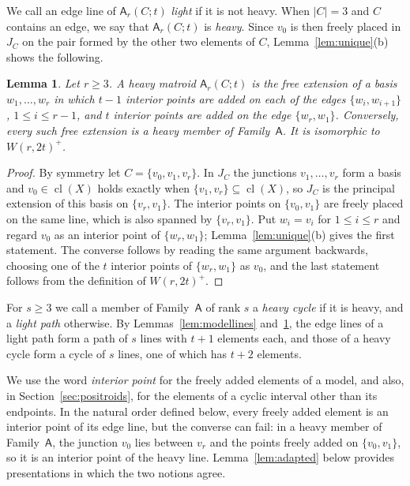 \documentclass[11pt]{amsart}
\newtheorem{lemma}[theorem]{Lemma}
\theoremstyle{definition}
\theoremstyle{remark}
\numberwithin{equation}{section}
\newcommand{\cl}{\operatorname{cl}}
\newcommand{\FA}{\mathsf{A}}
\begin{document}
We call an edge line of $\FA_r(C;t)$ \emph{light} if it is not heavy. When $|C|=3$ and $C$ contains an edge, we say that $\FA_r(C;t)$ is \emph{heavy}. Since $v_0$ is then freely placed in $J_C$ on the pair formed by the other two elements of $C$, Lemma~\ref{lem:unique}(b) shows the following.

\begin{lemma}\label{lem:heavywhirl}
Let $r\ge3$. A heavy matroid $\FA_r(C;t)$ is the free extension of a basis $w_1,\dots,w_r$ in which $t-1$ interior points are added on each of the edges $\{w_i,w_{i+1}\}$, $1\le i\le r-1$, and $t$ interior points are added on the edge $\{w_r,w_1\}$. Conversely, every such free extension is a heavy member of Family~$\FA$. It is isomorphic to $W(r,2t)^+$.
\end{lemma}

\begin{proof}
By symmetry let $C=\{v_0,v_1,v_r\}$. In $J_C$ the junctions $v_1,\dots,v_r$ form a basis and $v_0\in\cl(X)$ holds exactly when $\{v_1,v_r\}\subseteq\cl(X)$, so $J_C$ is the principal extension of this basis on $\{v_r,v_1\}$. The interior points on $\{v_0,v_1\}$ are freely placed on the same line, which is also spanned by $\{v_r,v_1\}$. Put $w_i=v_i$ for $1\le i\le r$ and regard $v_0$ as an interior point of $\{w_r,w_1\}$; Lemma~\ref{lem:unique}(b) gives the first statement. The converse follows by reading the same argument backwards, choosing one of the $t$ interior points of $\{w_r,w_1\}$ as $v_0$, and the last statement follows from the definition of $W(r,2t)^+$.
\end{proof}

For $s\ge3$ we call a member of Family~$\FA$ of rank $s$ a \emph{heavy cycle} if it is heavy, and a \emph{light path} otherwise. By Lemmas~\ref{lem:modellines} and~\ref{lem:heavywhirl}, the edge lines of a light path form a path of $s$ lines with $t+1$ elements each, and those of a heavy cycle form a cycle of $s$ lines, one of which has $t+2$ elements.

We use the word \emph{interior point} for the freely added elements of a model, and also, in Section~\ref{sec:positroids}, for the elements of a cyclic interval other than its endpoints. In the natural order defined below, every freely added element is an interior point of its edge line, but the converse can fail: in a heavy member of Family~$\FA$, the junction $v_0$ lies between $v_r$ and the points freely added on $\{v_0,v_1\}$, so it is an interior point of the heavy line. Lemma~\ref{lem:adapted} below provides presentations in which the two notions agree.
\end{document}
